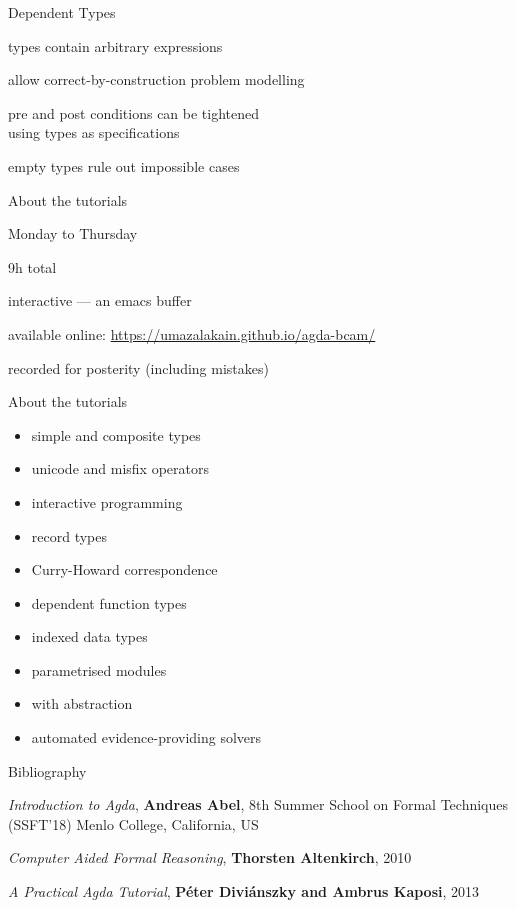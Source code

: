 \documentclass[dvipsnames]{beamer}
\newenvironment{wideitemize}{\itemize\addtolength{\itemsep}{1em}}{\enditemize}
\newcommand{\sitem}{\item[\raisebox{.45ex}{\rule{.6ex}{.6ex}}]}
\begin{document}
\begin{frame}{Dependent Types}
  \begin{wideitemize}
    \sitem types contain arbitrary expressions
    \sitem allow correct-by-construction problem modelling
    \sitem pre and post conditions can be tightened\\ using types as specifications 
    \sitem empty types rule out impossible cases
  \end{wideitemize}
\end{frame}

\begin{frame}{About the tutorials}
\begin{wideitemize}
  \sitem Monday to Thursday
  \sitem 9h total
  \sitem interactive --- an emacs buffer
  \sitem available online: \url{https://umazalakain.github.io/agda-bcam/}
  \sitem recorded for posterity (including mistakes)
\end{wideitemize}
\end{frame}

\begin{frame}{About the tutorials}
\begin{itemize}
  \sitem simple and composite types
  \sitem unicode and misfix operators
  \sitem interactive programming
  \sitem record types
  \sitem Curry-Howard correspondence
  \sitem dependent function types
  \sitem indexed data types
  \sitem parametrised modules
  \sitem with abstraction
  \sitem automated evidence-providing solvers
\end{itemize}
\end{frame}

\begin{frame}{Bibliography}
\begin{wideitemize}
  \sitem \emph{Introduction to Agda}, \textbf{Andreas Abel}, 8th Summer School on Formal Techniques (SSFT’18) Menlo College, California, US
  \sitem \emph{Computer Aided Formal Reasoning}, \textbf{Thorsten Altenkirch}, 2010
  \sitem \emph{A Practical Agda Tutorial}, \textbf{Péter Diviánszky and Ambrus Kaposi}, 2013
\end{wideitemize}
\end{frame}
\end{document}

